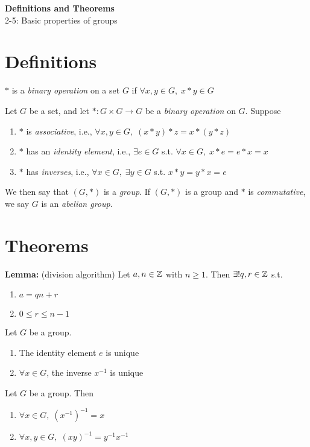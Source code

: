 \noindent
\textbf{\LARGE Definitions and Theorems} \\
\large 2-5: Basic properties of groups

\normalsize

\section*{Definitions}

 $\ast$ is a \textit{binary operation} on a set $G$ if $\forall x, y \in G,\; x \ast y \in G$

\bigskip 

 Let $G$ be a set, and let $\ast: G \times G \rightarrow G$ be a \textit{binary operation} on $G$. Suppose
\begin{enumerate}
    \item $\ast$ is \textit{associative}, i.e., $\forall x, y \in G, \; (x \ast y) \ast z = x \ast (y \ast z)$
    \item $\ast$ has an \textit{identity element}, i.e., $\exists e \in G$ s.t. $\forall x \in G, \; x \ast e = e \ast x = x$
    \item $\ast$ has \textit{inverses}, i.e., $\forall x \in G, \; \exists y \in G $ s.t. $x \ast y = y \ast x = e$
\end{enumerate}
We then say that $(G, \ast)$ is a \textit{group}.
If $(G, \ast)$ is a group and $\ast$ is \textit{commutative}, we say $G$ is an \textit{abelian group}.

\section*{Theorems}
\textbf{Lemma:} (division algorithm) Let $a, n \in \mathbb{Z}$ with $ n \ge 1$. Then $\exists ! q, r \in \mathbb{Z}$ s.t.
\begin{enumerate}
    \item $a = qn + r$
    \item $0 \le r \le n - 1$
\end{enumerate}

\prop Let $G$ be a group.
\begin{enumerate}
    \item The identity element $e$ is unique
    \item $\forall x \in G$, the inverse $x^{-1}$ is unique
\end{enumerate}

\prop Let $G$ be a group. Then 
\begin{enumerate}
    \item $\forall x \in G,\; (x^{-1})^{-1} = x$
    \item $\forall x, y \in G, \; (xy)^{-1}=y^{-1}x^{-1}$
\end{enumerate}

